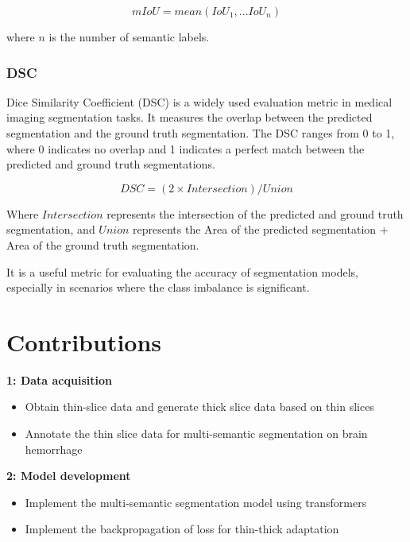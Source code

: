 \documentclass{article}
\begin{document}
\begin{equation}
  mIoU = mean(IoU_1, ...IoU_n)
  \label{eq:14}
\end{equation}

where $n$ is the number of semantic labels.

\subsubsection{DSC}

Dice Similarity Coefficient (DSC) is a widely used evaluation metric in medical imaging segmentation tasks. It measures the overlap between the predicted segmentation and the ground truth segmentation. The DSC ranges from 0 to 1, where 0 indicates no overlap and 1 indicates a perfect match between the predicted and ground truth segmentations. 

\begin{equation}
  DSC = (2 \times Intersection)/Union
  \label{eq:15}
\end{equation}

Where $Intersection$ represents the intersection of the predicted and ground truth segmentation, and $Union$ represents the Area of the predicted segmentation + Area of the ground truth segmentation.

It is a useful metric for evaluating the accuracy of segmentation models, especially in scenarios where the class imbalance is significant.


\section{Contributions}

\textbf{1: Data acquisition}

\begin{itemize}
    \item Obtain thin-slice data and generate thick slice data based on thin slices
    \item Annotate the thin slice data for multi-semantic segmentation on brain hemorrhage
\end{itemize}

\textbf{2: Model development}

\begin{itemize}
    \item Implement the multi-semantic segmentation model using transformers
    \item Implement the backpropagation of loss for thin-thick adaptation
\end{itemize}
\end{document}
